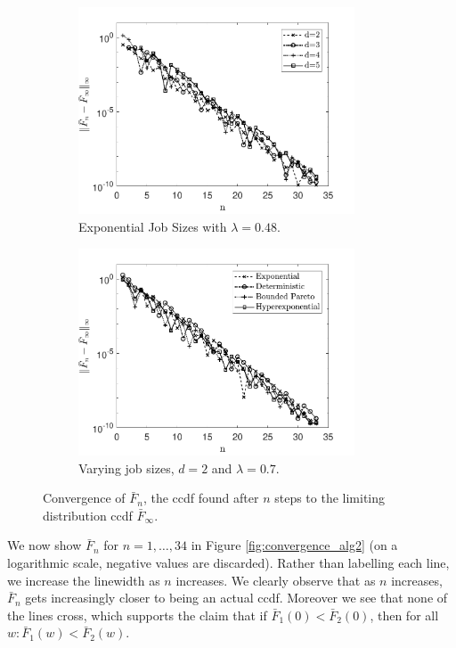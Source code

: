 \documentclass[12pt]{report}
\begin{document}
\begin{figure}[t]
\begin{subfigure}{.45\textwidth}
\centering
\includegraphics[width=0.9\textwidth]{figures/Chapter3/plot_convergence1.pdf}
\caption{Exponential Job Sizes with $\lambda=0.48$.}
\label{fig:convergence_alg1.1}
\end{subfigure}
\begin{subfigure}{.45\textwidth}
\centering
\includegraphics[width=0.9\textwidth]{figures/Chapter3/plot_convergence2.pdf}
\caption{Varying job sizes, $d=2$ and $\lambda =0.7$.}
\label{fig:convergence_alg1.2}
\end{subfigure}
\caption{Convergence of $\bar F_n$, the ccdf found after $n$ steps to the limiting distribution ccdf $\bar F_{\infty}$.}
\label{fig:convergence_alg1}
\end{figure}
We now show $\bar F_n$ for $n=1,\dots,34$ in Figure \ref{fig:convergence_alg2} (on a logarithmic scale, negative values are discarded). Rather than labelling each line, we increase the linewidth as $n$ increases. We clearly observe that as $n$ increases, $\bar F_n$ gets increasingly closer to being an actual ccdf. Moreover we see that none of the lines cross, which supports the claim that if $\bar F_1(0) < \bar F_2(0)$, then for all $w: \bar F_1(w) < \bar F_2(w)$.
\end{document}
